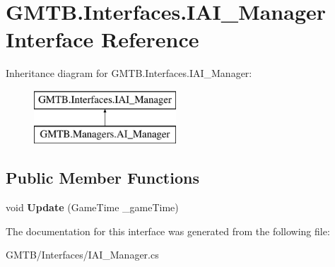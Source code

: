 \hypertarget{interface_g_m_t_b_1_1_interfaces_1_1_i_a_i___manager}{}\section{G\+M\+T\+B.\+Interfaces.\+I\+A\+I\+\_\+\+Manager Interface Reference}
\label{interface_g_m_t_b_1_1_interfaces_1_1_i_a_i___manager}
Inheritance diagram for G\+M\+T\+B.\+Interfaces.\+I\+A\+I\+\_\+\+Manager\+:\begin{figure}[H]
\begin{center}
\leavevmode
\includegraphics[height=2.000000cm]{interface_g_m_t_b_1_1_interfaces_1_1_i_a_i___manager}
\end{center}
\end{figure}
\subsection*{Public Member Functions}
\begin{DoxyCompactItemize}
\item 
\mbox{\label{interface_g_m_t_b_1_1_interfaces_1_1_i_a_i___manager_ab2a8356701d718df99c5231ce76a93b6}} 
void {\bfseries Update} (Game\+Time \+\_\+game\+Time)
\end{DoxyCompactItemize}


The documentation for this interface was generated from the following file\+:\begin{DoxyCompactItemize}
\item 
G\+M\+T\+B/\+Interfaces/I\+A\+I\+\_\+\+Manager.\+cs\end{DoxyCompactItemize}
